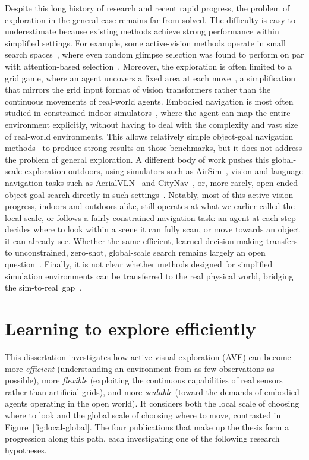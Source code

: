 Despite this long history of research and recent rapid progress, the problem of exploration in the general case remains far from solved.
The difficulty is easy to underestimate because existing methods achieve strong performance within simplified settings.
For example, some active-vision methods operate in small search spaces~\cite{seifi2021glimpse}, where even random glimpse selection was found to perform on par with attention-based selection~\cite{Jha2023WACV}.
Moreover, the exploration is often limited to a grid game, where an agent uncovers a fixed area at each move~\cite{rangrej2022consistency},
 a simplification that mirrors the grid input format of vision transformers rather than the continuous movements of real-world agents. Embodied navigation is most often studied in constrained indoor simulators~\cite{savva2019habitat,kolve2017ai2,xia2018gibson},
where the agent can map the entire environment explicitly, without having to deal with the complexity and vast size of real-world environments.
This allows relatively simple object-goal navigation methods~\cite{batra2020objectnav,gu2022vision} to produce strong results on those benchmarks, but it does not address the problem of general exploration.
A different body of work pushes this global-scale exploration outdoors, using simulators such as AirSim~\cite{airsim2017fsr}, vision-and-language navigation tasks such as
AerialVLN~\cite{liu2023aerialvln} and CityNav~\cite{lee2024citynav}, or, more rarely, open-ended object-goal search directly in such settings~\cite{xie2023reasoning}.
Notably, most of this active-vision progress, indoors and outdoors alike, still operates at what we earlier called the
local scale, or follows a fairly constrained navigation task: an agent at each step decides where to look within a scene it can fully scan, or move towards an object it can already see.
Whether the same efficient, learned decision-making transfers to unconstrained, zero-shot, global-scale search remains largely an open question~\cite{bajcsy2018revisiting,ramakrishnan2021exploration}.
Finally, it is not clear whether methods designed for simplified simulation environments can be transferred to the real physical world, bridging the sim-to-real~gap~\cite{aljalbout2025reality}.


\section{Learning to explore efficiently}
\label{sec:learning-to-explore-efficiently}

This dissertation investigates how active visual exploration (AVE) can become more \emph{efficient}  (understanding an environment from as few observations as possible), more \emph{flexible} (exploiting the continuous capabilities of real sensors rather than artificial grids), and more \emph{scalable} (toward the demands of embodied agents operating in the open world). It considers both the local scale of choosing where to look and the global scale of choosing where to move, contrasted in Figure~\ref{fig:local-global}. The four publications that make up the thesis form a progression along this path, each investigating one of the following research hypotheses.


